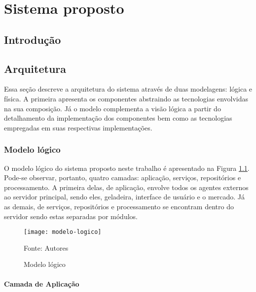 \chapter{Sistema proposto}
\label{cap:sistema_proposto}

\section{Introdução}

\section{Arquitetura}

Essa seção descreve a arquitetura do sistema através de duas modelagens: lógica e física. A primeira apresenta os componentes abstraindo as tecnologias envolvidas na sua composição. Já o modelo complementa a visão lógica a partir do detalhamento da implementação dos componentes bem como as tecnologias empregadas em suas respectivas implementações.

\subsection{Modelo lógico}

O modelo lógico do sistema proposto neste trabalho é apresentado na Figura \ref{fig:c4_modelo_logico}. Pode-se observar, portanto, quatro camadas: aplicação, serviços, repositórios e processamento. A primeira delas, de aplicação, envolve todos os agentes externos ao servidor principal, sendo eles, geladeira, interface de usuário e o mercado. Já as demais, de serviços, repositórios e processamento se encontram dentro do servidor sendo estas separadas por módulos.


\begin{figure}[htb]
    \caption{Modelo lógico}
    \label{fig:c4_modelo_logico}
    \texttt{[image: modelo-logico]}
    
    Fonte: Autores
\end{figure}
\nocite{Freepik2017} %



\subsubsection{Camada de Aplicação}


